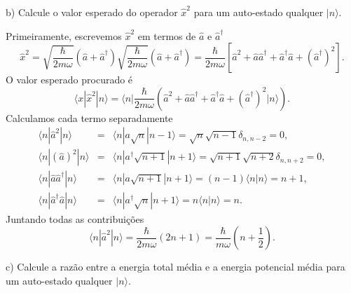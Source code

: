 \begin{enumerate}[start=1,label={\bfseries Q\arabic*.}]
b) Calcule o valor esperado do operador $\hat{x}^{2}$ para um auto-estado qualquer $|n\rangle$.

\resposta Primeiramente, escrevemos $\hat{x}^{2}$ em termos de $\hat{a}$ e $\hat{a}^{\dagger}$
%
\begin{equation}
  \hat{x}^{2} = \sqrt{\frac{\hbar}{2m\omega}} (\hat{a} + \hat{a}^{\dagger}) \sqrt{\frac{\hbar}{2m\omega}} (\hat{a} + \hat{a}^{\dagger}) = \frac{\hbar}{2m\omega} \left[ \hat{a}^{2} + \hat{a} \hat{a}^{\dagger} + \hat{a}^{\dagger} \hat{a} + (\hat{a}^{\dagger})^{2} \right] .
\end{equation}
%
O valor esperado procurado é
\begin{equation}
  \langle x | \hat{x}^{2} | n \rangle = \langle n | \frac{\hbar}{2m \omega} \left( \hat{a}^{2} + \hat{a} \hat{a}^{\dagger} + \hat{a}^{\dagger} \hat{a} + (\hat{a}^{\dagger})^{2} | n \rangle \right) .
\end{equation}
%
Calculamos cada termo separadamente
%
\begin{equation}
  \begin{array}{ccc}
    \langle n | \hat{a}^{2} | n \rangle & = &  \langle n | a \sqrt{n} | n -1 \rangle = \sqrt{n} \sqrt{n-1}  \delta_{n, n - 2} = 0, \\
    \langle n | (\hat{a})^{2} | n \rangle & = &  \langle n | a^{\dagger} \sqrt{n+1} | n + 1 \rangle = \sqrt{n+1} \sqrt{n+2}  \delta_{n, n + 2} = 0, \\
    \langle n | \hat{a} \hat{a}^{\dagger} | n \rangle & = &  \langle n | a \sqrt{n+1} | n + 1 \rangle = (n-1) \langle n | n \rangle  = n+1 , \\
    \langle n | \hat{a}^{\dagger} \hat{a} | n \rangle & = &  \langle n | a^{\dagger} \sqrt{n} | n + 1 \rangle = n \langle n | n \rangle  = n .
  \end{array}
\end{equation}
%
Juntando todas as contribuições
%
\begin{equation}
  \langle n | \hat{a}^{2} | n \rangle = \frac{\hbar}{2m\omega} (2n + 1) = \frac{\hbar}{m\omega} \left( n + \frac{1}{2}  \right) .
\end{equation}



c) Calcule a razão entre a energia total média e a energia potencial média para um auto-estado qualquer $|n\rangle$.


\end{enumerate}
